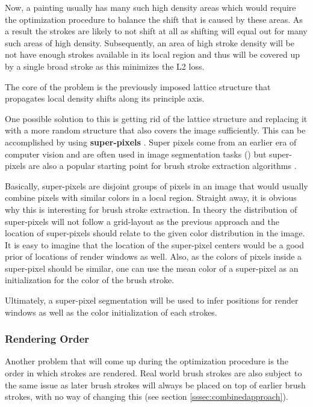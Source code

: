 Now, a painting usually has many such high density areas which would require the
optimization procedure to balance the shift that is caused by these areas.
As a result the strokes are likely to not shift at all as shifting will equal out
for many such areas of high density.
Subsequently, an area of high stroke density will be not have enough strokes available
in its local region and thus will be covered up by a single broad stroke as this minimizes
the L2 loss.

The core of the problem is the previously imposed lattice structure that propagates
local density shifts along its principle axis.

One possible solution to this is getting rid of the lattice structure and replacing
it with a more random structure that also covers the image sufficiently.
This can be accomplished by using \textbf{super-pixels} \cite{superpixels}.
Super pixels come from an earlier era of computer vision and are often used in image
segmentation tasks (\cite{img segmentation with SP}) but super-pixels are also
a popular starting point for brush stroke extraction algorithms \cite{brushs stroke extraction}.

Basically, super-pixels are disjoint groups of pixels in an image that would usually
combine pixels with similar colors in a local region.
Straight away, it is obvious why this is interesting for brush stroke extraction.
In theory the distribution of super-pixels will not follow a grid-layout as the previous
approach and the location of super-pixels should relate to the given color distribution
in the image.
It is easy to imagine that the location of the super-pixel centers would be a good prior
of locations of render windows as well.
Also, as the colors of pixels inside a super-pixel should be similar, one can use
the mean color of a super-pixel as an initialization for the color of the brush stroke.

Ultimately, a super-pixel segmentation will be used to infer positions for render
windows as well as the color initialization of each strokes.

\subsubsection{Rendering Order}
Another problem that will come up during the optimization procedure is the order
in which strokes are rendered.
Real world brush strokes are also subject to the same issue as later brush strokes
will always be placed on top of earlier brush strokes, with no way of changing this
(see section \ref{sssec:combinedapproach}).

